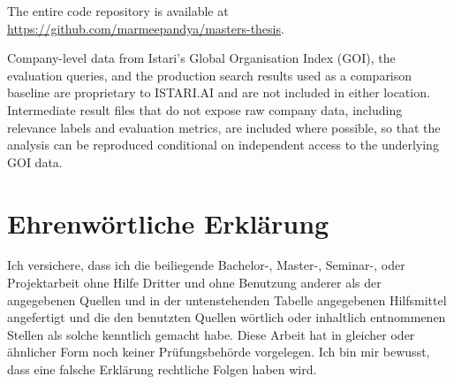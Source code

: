 \documentclass[a4paper,oneside,bibliography=totoc]{scrbook}
\begin{document}
The entire code repository is available at \url{https://github.com/marmeepandya/masters-thesis}.

Company-level data from Istari's Global Organisation Index (GOI), the evaluation queries, and the production search results used as a comparison baseline are proprietary to ISTARI.AI and are not included in either location. Intermediate result files that do not expose raw company data, including relevance labels and evaluation metrics, are included where possible, so that the analysis can be reproduced conditional on independent access to the underlying GOI data.

\chapter{Ehrenwörtliche Erklärung}

Ich versichere, dass ich die beiliegende Bachelor-, Master-, Seminar-, oder Projektarbeit ohne Hilfe Dritter und ohne Benutzung anderer als der angegebenen Quellen und in der untenstehenden Tabelle angegebenen Hilfsmittel angefertigt und die den benutzten Quellen wörtlich oder inhaltlich entnommenen Stellen als solche kenntlich gemacht habe. Diese Arbeit hat in gleicher oder ähnlicher Form noch keiner Prüfungsbehörde vorgelegen. Ich bin mir bewusst, dass eine falsche Erklärung rechtliche Folgen haben wird.
\end{document}
